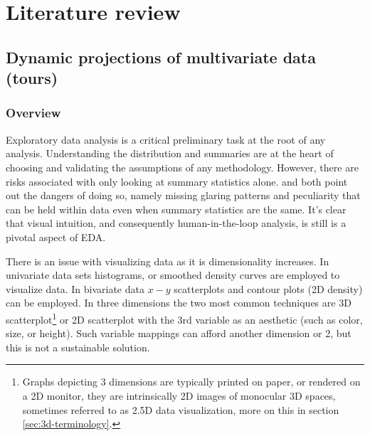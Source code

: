 \documentclass{monashthesis}
\begin{document}
\chapter{Literature review}\label{ch:lit_review}

\section{Dynamic projections of multivariate data
(tours)}\label{sec:tour}

\subsection{Overview}\label{overview}

Exploratory data analysis is a critical preliminary task at the root of
any analysis. Understanding the distribution and summaries are at the
heart of choosing and validating the assumptions of any methodology.
However, there are risks associated with only looking at summary
statistics alone. \textcite{anscombe_graphs_1973} and
\textcite{matejka_same_2017} both point out the dangers of doing so,
namely missing glaring patterns and peculiarity that can be held within
data even when summary statistics are the same. It's clear that visual
intuition, and consequently human-in-the-loop analysis, is still is a
pivotal aspect of EDA.

There is an issue with visualizing data as it is dimensionality
increases. In univariate data sets histograms, or smoothed density
curves are employed to visualize data. In bivariate data \(x-y\)
scatterplots and contour plots (2D density) can be employed. In three
dimensions the two most common techniques are 3D
scatterplot\footnote{Graphs depicting 3 dimensions are typically printed on paper, or rendered on a 2D monitor, they are intrinsically 2D images of monocular 3D spaces, sometimes referred to as 2.5D data visualization, more on this in section \ref{sec:3d-terminology}.}
or 2D scatterplot with the 3rd variable as an aesthetic (such as color,
size, or height). Such variable mappings can afford another dimension or
2, but this is not a sustainable solution.
\end{document}
